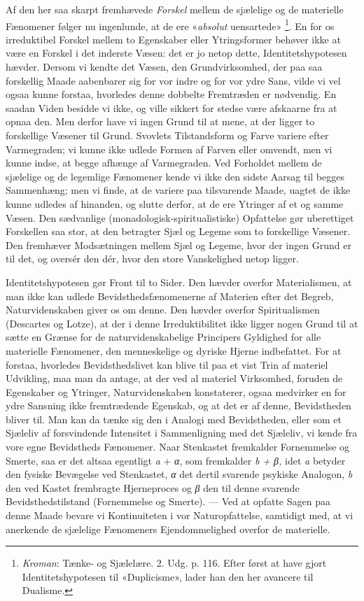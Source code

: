 \documentclass[12pt,a4paper,openany]{book}
\newcommand{\opage}[1]{\marginnote{\footnotesize\textit{[#1]}}}
\begin{document}
Af den her saa skarpt fremhævede \emph{Forskel} mellem de sjælelige og de
materielle Fænomener følger nu ingenlunde, at de ere «\emph{absolut} uensartede»%
\footnote[1]{\emph{Kroman}: Tænke- og Sjælelære. 2. Udg. p. 116. Efter først at
have gjort Identitetshypotesen til «Duplicisme», lader han den her avancere til
Dualisme.}. En for os irreduktibel Forskel mellem to Egenskaber eller
Ytringsformer behøver ikke at være en Forskel i det inderste Væsen: det er jo
netop dette, Identitetshypotesen hævder. Dersom vi kendte det Væsen, den
Grundvirksomhed, der paa saa forskellig Maade aabenbarer sig for vor indre og
for vor ydre Sans, vilde vi vel ogsaa kunne forstaa, hvorledes denne dobbelte
Fremtræden er nødvendig. En saadan Viden besidde vi ikke, og ville sikkert for
stedse være afskaarne fra at opnaa den. Men derfor have vi ingen Grund til at
mene, at der ligger
\setcounter{footnote}{0}%
\opage{86}to forskellige Væsener til Grund. Svovlets Tilstandsform og Farve
variere efter Varmegraden; vi kunne ikke udlede Formen af Farven eller omvendt,
men vi kunne indse, at begge afhænge af Varmegraden. Ved Forholdet mellem de
sjælelige og de legemlige Fænomener kende vi ikke den sidste Aarsag til begges
Sammenhæng; men vi finde, at de variere paa tilsvarende Maade, uagtet de ikke
kunne udledes af hinanden, og slutte derfor, at de ere Ytringer af et og samme
Væsen. Den sædvanlige (monadologisk-spiritualistiske) Opfattelse gør
uberettiget Forskellen saa stor, at den betragter Sjæl og Legeme som to
forskellige Væsener. Den fremhæver Modsætningen mellem Sjæl og Legeme, hvor der
ingen Grund er til det, og oversér den dér, hvor den store Vanskelighed netop ligger.

Identitetshypotesen gør Front til to Sider. Den hævder overfor Materialismen,
at man ikke kan udlede Bevidsthedsfænomenerne af Materien efter det Begreb,
Naturvidenskaben giver os om denne. Den hævder overfor Spiritualismen
(Descartes og Lotze), at der i denne Irreduktibilitet ikke ligger nogen Grund
til at sætte en Grænse for de naturvidenskabelige Principers Gyldighed for alle
materielle Fænomener, den menneskelige og dyriske Hjerne indbefattet. For at
forstaa, hvorledes Bevidsthedslivet kan blive til paa et vist Trin af materiel
Udvikling, maa man da antage, at der ved al materiel Virksomhed, foruden de
Egenskaber og Ytringer, Naturvidenskaben konstaterer, ogsaa medvirker en for
ydre Sansning ikke fremtrædende Egenskab, og at det er af denne, Bevidstheden
bliver til. Man kan da tænke sig den i Analogi med Bevidstheden, eller som et
Sjæleliv af forsvindende Intensitet i Sammenligning med det Sjæleliv, vi kende
fra vore egne Bevidstheds Fænomener. Naar Stenkastet fremkalder Fornemmelse og
Smerte, saa er det altsaa egentligt \textit{a} + \textit{α}, som fremkalder
\textit{b + β,} idet \textit{a} betyder den fysiske Bevægelse ved Stenkastet,
\textit{α} det dertil svarende psykiske Analogon, \textit{b} den ved Kastet
frembragte Hjerneproces og \textit{β} den til denne svarende
Bevidsthedstilstand (Fornemmelse og Smerte). --- Ved at opfatte Sagen paa denne
Maade bevare vi Kontinuiteten i vor Naturopfattelse, samtidigt med, at vi
anerkende de sjælelige Fænomeners Ejendommelighed overfor de materielle.
\end{document}
